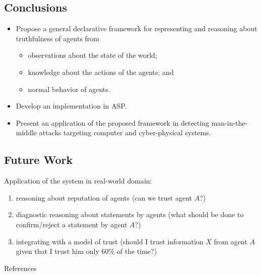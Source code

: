 \documentclass[unknownkeysallowed]{beamer}
\begin{document}
\subsection*{Conclusions} 
\begin{frame}{}
\begin{itemize} 
\item Propose a general declarative framework for representing and reasoning about truthfulness 
 of agents from  
\begin{itemize} 
\item observations about the state of the world;  
\item knowledge about the actions of the agents; and
\item normal behavior of agents.
\end{itemize} 
\item Develop an implementation in ASP. 
\item Present an application of the proposed framework in 
detecting man-in-the-middle attacks targeting computer and cyber-physical systems.  
\end{itemize}
\end{frame} 
 

%
%

\subsection*{Future Work} 

\begin{frame}{} 

Application of the system in real-world domain:  
\begin{enumerate} 
\item reasoning about reputation of agents (can we trust agent $A$?) 
\item diagnostic reasoning about statements by agents (what should be done to confirm/reject a statement by agent $A$?)  
\item integrating with a model of trust (should I trust information $X$ from agent $A$ given that I trust him only 60\% of the time?)    
\end{enumerate} 

\end{frame}

\begin{frame}{} 


 \end{frame}


\begin{block}{References} 

  
\end{block} 
\end{document}
